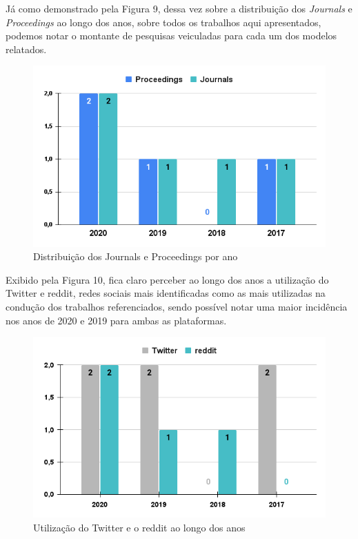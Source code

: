 \documentclass[conference]{IEEEtran}
\begin{document}
Já como demonstrado pela Figura 9, dessa vez sobre a distribuição dos \textit{Journals} e \textit{Proceedings} ao longo dos anos, sobre todos os trabalhos aqui apresentados, podemos notar o montante de pesquisas veiculadas para cada um dos modelos relatados.

\begin{figure}[h]
    \centering
    \includegraphics[scale=0.4]{images/quantitativo-tipo-publicacoes-por-ano.png}
    \caption{Distribuição dos Journals e Proceedings por ano}
    \label{fig:quantitativo-tipo-publicacoes-por-ano}
\end{figure}

Exibido pela Figura 10, fica claro perceber ao longo dos anos a utilização do Twitter e reddit, redes sociais mais identificadas como as mais utilizadas na condução dos trabalhos referenciados, sendo possível notar uma maior incidência nos anos de 2020 e 2019 para ambas as plataformas.

\begin{figure}[h]
    \centering
    \includegraphics[scale=0.4]{images/redes-sociais-por-ano.png}
    \caption{Utilização do Twitter e o reddit ao longo dos anos}
    \label{fig:redes-sociais-por-ano}
\end{figure}
\end{document}

